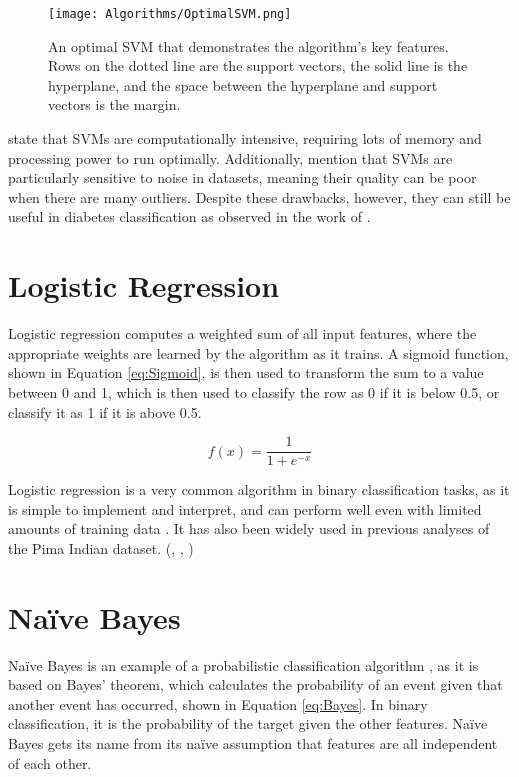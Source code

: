 \begin{figure}[H]
    \centering
    \texttt{[image: Algorithms/OptimalSVM.png]}
    \caption{An optimal SVM that demonstrates the algorithm's key features. Rows on the dotted line are the support vectors, the solid line is the hyperplane, and the space
    between the hyperplane and support vectors is the margin. \autocite{kirchner_using_2018}}
    \label{fig:OptimalSVM}
\end{figure}

\para \textcite{kirchner_using_2018} state that SVMs are computationally intensive, requiring lots of memory and processing power 
to run optimally. Additionally, \textcite{atla_sensitivity_2011} mention that SVMs are particularly sensitive to noise in 
datasets, meaning their quality can be poor when there are many outliers. Despite these drawbacks, however, they can still 
be useful in diabetes classification as observed in the work of \textcite{zou_construction_2024}.

\section{Logistic Regression}
Logistic regression computes a weighted sum of all input features, where the appropriate weights are learned by the algorithm as it trains.
A sigmoid function, shown in Equation \ref{eq:Sigmoid}, is then used to transform the sum to a value between 0 and 1, which is then used to classify the row as 0 if it is below 
0.5, or classify it as 1 if it is above 0.5. 

\begin{equation}\label{eq:Sigmoid}
    f(x) = \frac{1}{1 + e^{-x}}     
\end{equation}

\para Logistic regression is a very common algorithm in binary classification tasks, as it is simple to implement and interpret, and
can perform well even with limited amounts of training data \autocite{kavya_applications_2024}. It has also been widely used in previous 
analyses of the Pima Indian dataset. (\textcite{alzubi_diabetes_2023}, \textcite{joshi_predicting_2021}, \textcite{zou_construction_2024})

\section{Na\"ive Bayes}
Na\"ive Bayes is an example of a probabilistic classification algorithm \autocite{ibm_what_2021}, as it is based on Bayes' theorem,
which calculates the probability of an event given that another event has occurred, shown in Equation \ref{eq:Bayes}. 
In binary classification, it is the probability of the target given the other features. Na\"ive Bayes gets its name from its na\"ive assumption
that features are all independent of each other.

